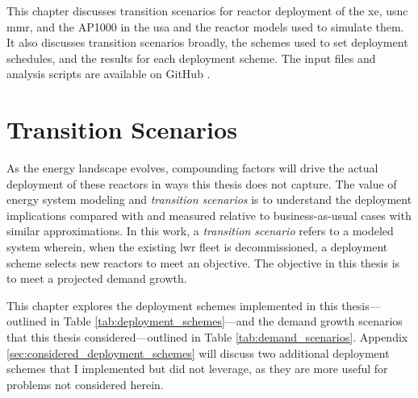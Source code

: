 This chapter discusses transition scenarios for reactor deployment of the \gls{xe}, \gls{usnc} \gls{mmr}, and the AP1000 in the \gls{usa} and the reactor models used to simulate them. It also discusses transition scenarios broadly, the schemes used to set deployment schedules, and the results for each deployment scheme. The input files and analysis scripts are available on GitHub \cite{ryan_transition}.

\section{Transition Scenarios}
\label{sec:transition_scenarios}

As the energy landscape evolves, compounding factors will drive the actual deployment of these reactors in ways this thesis does not capture. The value of energy system modeling and \textit{transition scenarios} is to understand the deployment implications compared with and measured relative to business-as-usual cases with similar approximations. In this work, a \textit{transition scenario} refers to a modeled system wherein, when the existing \gls{lwr} fleet is decommissioned, a deployment scheme selects new reactors to meet an objective. The objective in this thesis is to meet a projected demand growth.

This chapter explores the deployment schemes implemented in this thesis---outlined in Table \ref{tab:deployment_schemes}---and the demand growth scenarios that this thesis considered---outlined in Table \ref{tab:demand_scenarios}. Appendix \ref{sec:considered_deployment_schemes} will discuss two additional deployment schemes that I implemented but did not leverage, as they are more useful for problems not considered herein.

